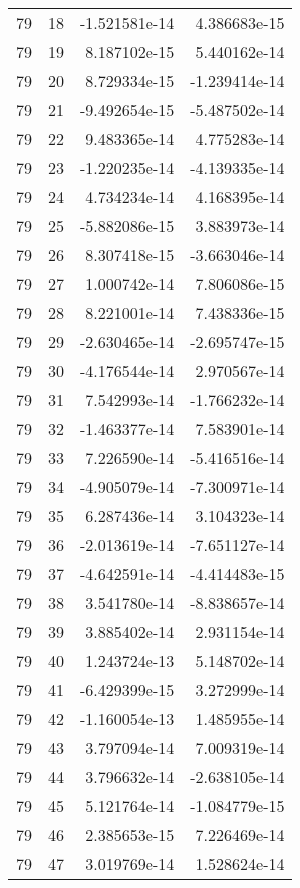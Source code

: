 \begin{tabular}{rrrr}
  79 &   18 & -1.521581e-14 &  4.386683e-15 \\
  79 &   19 &  8.187102e-15 &  5.440162e-14 \\
  79 &   20 &  8.729334e-15 & -1.239414e-14 \\
  79 &   21 & -9.492654e-15 & -5.487502e-14 \\
  79 &   22 &  9.483365e-14 &  4.775283e-14 \\
  79 &   23 & -1.220235e-14 & -4.139335e-14 \\
  79 &   24 &  4.734234e-14 &  4.168395e-14 \\
  79 &   25 & -5.882086e-15 &  3.883973e-14 \\
  79 &   26 &  8.307418e-15 & -3.663046e-14 \\
  79 &   27 &  1.000742e-14 &  7.806086e-15 \\
  79 &   28 &  8.221001e-14 &  7.438336e-15 \\
  79 &   29 & -2.630465e-14 & -2.695747e-15 \\
  79 &   30 & -4.176544e-14 &  2.970567e-14 \\
  79 &   31 &  7.542993e-14 & -1.766232e-14 \\
  79 &   32 & -1.463377e-14 &  7.583901e-14 \\
  79 &   33 &  7.226590e-14 & -5.416516e-14 \\
  79 &   34 & -4.905079e-14 & -7.300971e-14 \\
  79 &   35 &  6.287436e-14 &  3.104323e-14 \\
  79 &   36 & -2.013619e-14 & -7.651127e-14 \\
  79 &   37 & -4.642591e-14 & -4.414483e-15 \\
  79 &   38 &  3.541780e-14 & -8.838657e-14 \\
  79 &   39 &  3.885402e-14 &  2.931154e-14 \\
  79 &   40 &  1.243724e-13 &  5.148702e-14 \\
  79 &   41 & -6.429399e-15 &  3.272999e-14 \\
  79 &   42 & -1.160054e-13 &  1.485955e-14 \\
  79 &   43 &  3.797094e-14 &  7.009319e-14 \\
  79 &   44 &  3.796632e-14 & -2.638105e-14 \\
  79 &   45 &  5.121764e-14 & -1.084779e-15 \\
  79 &   46 &  2.385653e-15 &  7.226469e-14 \\
  79 &   47 &  3.019769e-14 &  1.528624e-14 \\

\end{tabular}
